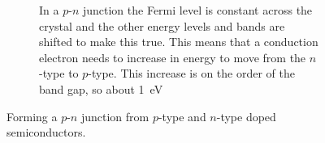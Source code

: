 \documentclass[fleqn]{NotesClass}
\begin{document}
\begin{figure}
\begin{subfigure}{0.8\textwidth}
            \caption{In a \(p\)-\(n\) junction the Fermi level is constant across the crystal and the other energy levels and bands are shifted to make this true. This means that a conduction electron needs to increase in energy to move from the \(n\)-type to \(p\)-type. This increase is on the order of the band gap, so about \qty{1}{\electronvolt}}
        \end{subfigure}
        \caption[A \(p\)-\(n\) junction.]{Forming a \(p\)-\(n\) junction from \(p\)-type and \(n\)-type doped semiconductors.}
        \label{fig:pn junction}
    \end{figure}
    
\end{document}
